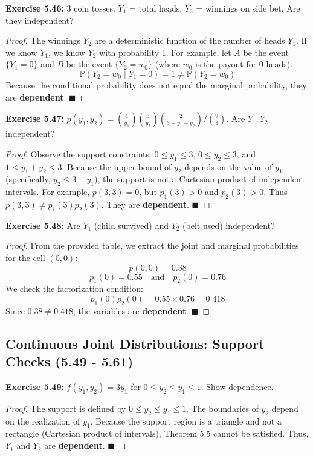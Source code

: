 \documentclass[11pt, a4paper]{article}
\theoremstyle{definition}
\theoremstyle{remark}
\newcommand{\Prob}{\mathbb{P}}
\begin{document}
\textbf{Exercise 5.46:} 3 coin tosses. $Y_1$ = total heads, $Y_2$ = winnings on side bet. Are they independent?
\begin{proof}
The winnings $Y_2$ are a deterministic function of the number of heads $Y_1$. If we know $Y_1$, we know $Y_2$ with probability 1. For example, let $A$ be the event $\{Y_1 = 0\}$ and $B$ be the event $\{Y_2 = w_0\}$ (where $w_0$ is the payout for 0 heads).
\[ \Prob(Y_2 = w_0 \mid Y_1 = 0) = 1 \neq \Prob(Y_2 = w_0) \]
Because the conditional probability does not equal the marginal probability, they are \textbf{dependent}. $\blacksquare$
\end{proof}

\textbf{Exercise 5.47:} $p(y_1, y_2) = \binom{4}{y_1}\binom{3}{y_2}\binom{2}{3-y_1-y_2} / \binom{9}{3}$. Are $Y_1, Y_2$ independent?
\begin{proof}
Observe the support constraints: $0 \le y_1 \le 3$, $0 \le y_2 \le 3$, and $1 \le y_1 + y_2 \le 3$.
Because the upper bound of $y_2$ depends on the value of $y_1$ (specifically, $y_2 \le 3 - y_1$), the support is not a Cartesian product of independent intervals. 
For example, $p(3, 3) = 0$, but $p_1(3) > 0$ and $p_2(3) > 0$. Thus $p(3,3) \neq p_1(3)p_2(3)$. They are \textbf{dependent}. $\blacksquare$
\end{proof}

\textbf{Exercise 5.48:} Are $Y_1$ (child survived) and $Y_2$ (belt used) independent?
\begin{proof}
From the provided table, we extract the joint and marginal probabilities for the cell $(0,0)$:
\[ p(0,0) = 0.38 \]
\[ p_1(0) = 0.55 \quad \text{and} \quad p_2(0) = 0.76 \]
We check the factorization condition:
\[ p_1(0)p_2(0) = 0.55 \times 0.76 = 0.418 \]
Since $0.38 \neq 0.418$, the variables are \textbf{dependent}. $\blacksquare$
\end{proof}

\subsection{Continuous Joint Distributions: Support Checks (5.49 - 5.61)}

\textbf{Exercise 5.49:} $f(y_1, y_2) = 3y_1$ for $0 \le y_2 \le y_1 \le 1$. Show dependence.
\begin{proof}
The support is defined by $0 \le y_2 \le y_1 \le 1$. The boundaries of $y_2$ depend on the realization of $y_1$. Because the support region is a triangle and not a rectangle (Cartesian product of intervals), Theorem 5.5 cannot be satisfied. Thus, $Y_1$ and $Y_2$ are \textbf{dependent}. $\blacksquare$
\end{proof}
\end{document}
